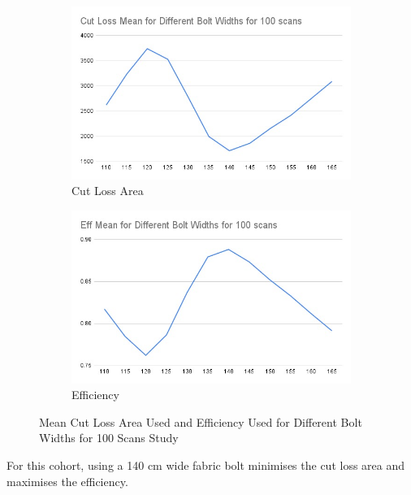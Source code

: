 \begin{figure}[H]
    \centering
    \begin{subfigure}[b]{0.45\textwidth}
        \centering
        \includegraphics[width=\textwidth]{Images/Cut Loss Mean for Different Bolt Widths for 100 scans.png}
        \caption{Cut Loss Area}
    \end{subfigure}
    \hfill
    \begin{subfigure}[b]{0.45\textwidth}
        \centering
        \includegraphics[width=\textwidth]{Images/Eff Mean for Different Bolt Widths for 100 scans.png}
        \caption{Efficiency}
    \end{subfigure}
    \caption{Mean Cut Loss Area Used and Efficiency Used for Different Bolt Widths for 100 Scans Study}
\end{figure}

For this cohort, using a 140 cm wide fabric bolt minimises the cut loss area and maximises the efficiency.

